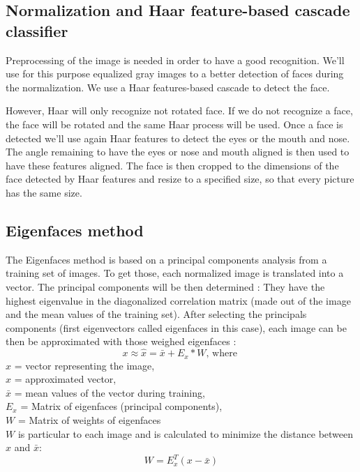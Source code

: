 \subsection{Normalization and Haar feature-based cascade classifier}
Preprocessing of the image is needed in order to have a good recognition. We'll use for this purpose equalized gray images to a better detection of faces during the normalization. We use a Haar features-based cascade to detect the face.

However, Haar will only recognize not rotated face. If we do not recognize a face, the face will be rotated and the same Haar process will be used. Once a face is detected we'll use again Haar features to detect the eyes or the mouth and nose. The angle remaining to have the eyes or nose and mouth aligned is then used to have these features aligned. The face is then cropped to the dimensions of the face detected by Haar features and resize to a specified size, so that every picture has the same size.

\subsection{Eigenfaces method}

The Eigenfaces method is based on a principal components analysis from a training set of images. To get those, each normalized image is translated into a vector. The principal components will be then determined : They have the highest eigenvalue in the diagonalized correlation matrix (made out of the image and the mean values of the training set). After selecting the principals components (first eigenvectors called eigenfaces in this case), each image can be then be approximated with those weighed eigenfaces :
\begin{equation}
x \approx  \hat{x} = \bar{x} + E_{x} * W \textrm{, where } 
\end{equation}
$x$ = vector representing the image,\\
$\hat{x}$ = approximated vector,\\
$\bar{x}$ = mean values of the vector during training,\\
$E_{x}$ = Matrix of eigenfaces (principal components),\\
$W$ = Matrix of weights of eigenfaces\\

$W$ is particular to each image and is calculated to minimize the distance between $x$ and $\bar{x}$:
\begin{equation}
W = E_{x}^T (x-\bar{x}) 
\end{equation}

